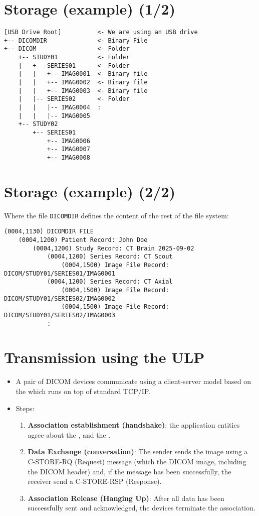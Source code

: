 \section{Storage (example) (1/2)}
\begin{verbatim}
[USB Drive Root]          <- We are using an USB drive
+-- DICOMDIR              <- Binary File
+-- DICOM                 <- Folder
    +-- STUDY01           <- Folder
    |   +-- SERIES01      <- Folder
    |   |   +-- IMAG0001  <- Binary file
    |   |   +-- IMAG0002  <- Binary file
    |   |   +-- IMAG0003  <- Binary file
    |   |-- SERIES02      <- Folder
    |   |   |-- IMAG0004  :
    |   |   |-- IMAG0005
    +-- STUDY02
        +-- SERIES01
            +-- IMAG0006
            +-- IMAG0007
            +-- IMAG0008
\end{verbatim}

\section*{Storage (example) (2/2)}
Where the file \texttt{DICOMDIR} defines the content of the rest of the file system:
\begin{verbatim}
(0004,1130) DICOMDIR FILE
    (0004,1200) Patient Record: John Doe
        (0004,1200) Study Record: CT Brain 2025-09-02
            (0004,1200) Series Record: CT Scout
                (0004,1500) Image File Record: DICOM/STUDY01/SERIES01/IMAG0001
            (0004,1200) Series Record: CT Axial
                (0004,1500) Image File Record: DICOM/STUDY01/SERIES02/IMAG0002
                (0004,1500) Image File Record: DICOM/STUDY01/SERIES02/IMAG0003
            :
\end{verbatim}

\section{Transmission using the \gls{ULP}}
\begin{itemize}
\item A pair of \gls{DICOM} devices communicate using a client-server
  model based on the  which runs on top of standard TCP/IP.
\item Steps:
  \begin{enumerate}
  \item \textbf{Association establishment (handshake)}: the
    application entities agree about the , and the
    .
  \item \textbf{Data Exchange (conversation)}: The sender sends the
    image using a C-STORE-RQ (Request) message (which the DICOM image,
    including the DICOM header) and, if the message has been
    successfully, the receiver send a C-STORE-RSP (Response).
  \item \textbf{Association Release (Hanging Up)}: After all data has
    been successfully sent and acknowledged, the devices terminate the
    association.
  \end{enumerate}
\end{itemize}

